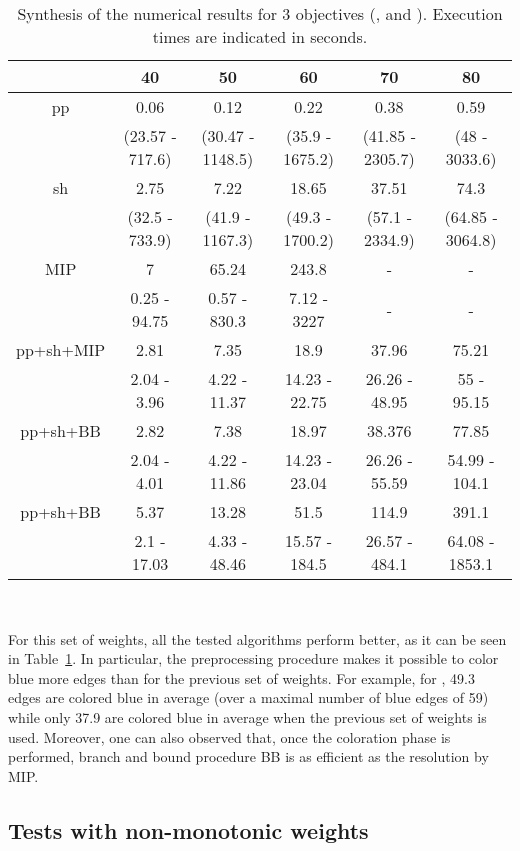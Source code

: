\documentclass[final,3p,times]{elsarticle}
\begin{document}
\begin{table}[!h]
  \begin{center}
  {\small \begin{tabular}{|c|ccccc|}    \hline
      \rule[1pt]{0pt}{13pt} 
    & 40&50&60&70&80\\
    \hline
    pp  &0.06&0.12&0.22&0.38&0.59\\
    	 &(23.57 - 717.6)&(30.47 - 1148.5)&(35.9 - 1675.2)&(41.85 - 2305.7)&(48 - 3033.6)\\
    sh&2.75&7.22&18.65&37.51&74.3\\
         &(32.5 - 733.9)&(41.9 - 1167.3)&(49.3 - 1700.2)&(57.1 - 2334.9)&(64.85 - 3064.8)\\
   \hline
 MIP&7&65.24&243.8&-&-\\
      &0.25 - 94.75&0.57 - 830.3 &7.12 - 3227& - & - \\
pp+sh+MIP&2.81&7.35&18.9&37.96&75.21\\
  &2.04 - 3.96&4.22 - 11.37&14.23 - 22.75&26.26 - 48.95&55 - 95.15\\
pp+sh+BB&2.82&7.38&18.97&38.376&77.85\\
     &2.04 - 4.01&4.22 - 11.86&14.23 - 23.04&26.26 - 55.59&54.99 - 104.1\\
pp+sh+BB&5.37&13.28&51.5&114.9&391.1\\
    &2.1 - 17.03&4.33 - 48.46&15.57 - 184.5&26.57 - 484.1&64.08 - 1853.1\\
  \hline
    \end{tabular}\\ [2ex]
}
\end{center}
\caption{\label{tabPL26} Synthesis of the numerical results for 3 objectives (,  and ). Execution times are indicated in seconds. 
}
\end{table}

For this set of weights, all the tested algorithms perform better, as it can be seen in
Table~\ref{tabPL26}. In particular, the preprocessing procedure makes it possible to color
blue more edges than for the previous set of weights. For example, for , 49.3 edges are colored blue
in average (over a maximal number of blue edges of 59)
while only 37.9 are colored blue in average when the
previous set of weights is used. Moreover, one can also observed that,
once the coloration phase is performed, branch and bound procedure
BB is as efficient as the
resolution by MIP.




\subsection{Tests with non-monotonic weights}
\end{document}
